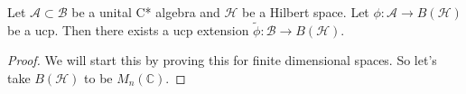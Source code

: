 

\begin{theorem}
  Let $\mathcal{A} \subset \mathcal{B}$ be a unital C* algebra and
  $\mathcal{H}$ be a
  Hilbert space. Let $\phi: \mathcal{A} \to B(\mathcal{H})$ be a ucp.
  Then there exists a ucp extension $  \tilde{\phi}: \mathcal{B} \to
  B(\mathcal{H})$.
\end{theorem}
\begin{proof}
  We will start this by proving this for   finite dimensional spaces.
  So let's take $B(\mathcal{H})$ to be $M_n(\mathbb{C})$.
\end{proof}
